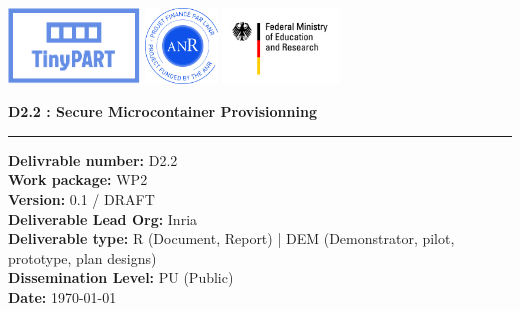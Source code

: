 \begin{titlepage}
		
			
			
			\includegraphics[height=2cm]{titlepage/Logo_TinyPART.pdf}
			\includegraphics[height=2cm]{titlepage/anr-projet-logo.jpg}
			\includegraphics[height=2cm]{titlepage/logo-bmbf.jpg}
			
			\vspace{0.5cm}

			
			\begin{center}
				\huge \bfseries D2.2 : Secure Microcontainer Provisionning
				\vspace{0.5cm}
				
				\rule{0.5\linewidth}{1pt}
			\end{center}
			
			\vspace{0.5cm}
					

			\textbf{Delivrable number: } D2.2\\
			\textbf{Work package: } WP2\\							
			\textbf{Version:} 0.1 / DRAFT\\
			\textbf{Deliverable Lead Org:} Inria\\
			\textbf{Deliverable type:} R (Document, Report) | DEM (Demonstrator, pilot, prototype, plan designs)\\
			\textbf{Dissemination Level:} PU (Public) \\ %
			\textbf{Date: } \today\\


\end{titlepage}
